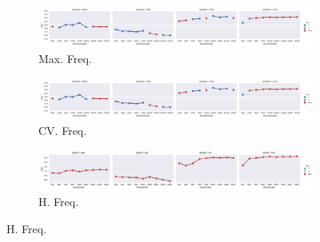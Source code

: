 


\begin{landscape}
\thispagestyle{empty} %

\begin{figure}
  \centering

  \begin{subfigure}[t]{0.49\textwidth}
    \includegraphics[width=\textwidth]{supplement/figures/GS11-max_-selection-freq}
    \caption{Max. Freq.}
    \label{fig:}
  \end{subfigure}
  \begin{subfigure}[t]{0.49\textwidth}
    \includegraphics[width=\textwidth]{supplement/figures/GS11-cross_validation-selection-freq}
    \caption{CV. Freq.}
    \label{fig:}
  \end{subfigure}
  \begin{subfigure}[t]{0.49\textwidth}
    \includegraphics[width=\textwidth]{supplement/figures/GS11-heuristics-selection-freq}
    \caption{H. Freq.}
    \label{fig:}
  \end{subfigure}


\end{figure}
\end{landscape}
